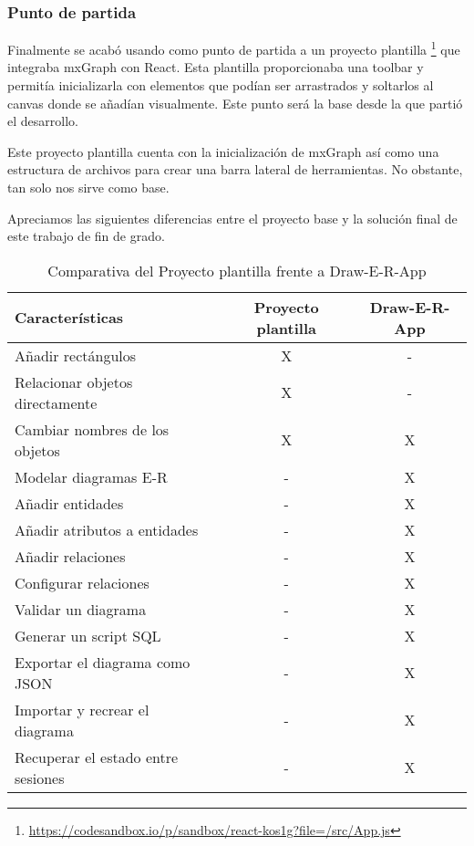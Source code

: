 \subsubsection{Punto de partida}
Finalmente se acabó usando como punto de partida a un proyecto plantilla \footnote{\url{https://codesandbox.io/p/sandbox/react-kos1g?file=/src/App.js}} que integraba mxGraph con React. Esta plantilla proporcionaba una toolbar y permitía inicializarla con elementos que podían ser arrastrados y soltarlos al canvas donde se añadían visualmente. Este punto será la base desde la que partió el desarrollo.

Este proyecto plantilla cuenta con la inicialización de mxGraph así como una estructura de archivos para crear una barra lateral de herramientas. No obstante, tan solo nos sirve como base.

Apreciamos las siguientes diferencias entre el proyecto base y la solución final de este trabajo de fin de grado.
\begin{table}[h]
\centering
\begin{tabular}{l c c}
\hline
\multicolumn{1}{l}{Características} & \textbf{Proyecto plantilla} & \textbf{Draw-E-R-App} \\
\hline
Añadir rectángulos & X & - \\
Relacionar objetos directamente & X & - \\
Cambiar nombres de los objetos & X & X \\
Modelar diagramas E-R & - & X \\
Añadir entidades & - & X \\
Añadir atributos a entidades & - & X \\
Añadir relaciones & - & X \\
Configurar relaciones & - & X \\
Validar un diagrama & - & X \\
Generar un script SQL & - & X \\
Exportar el diagrama como JSON & - & X \\
Importar y recrear el diagrama & - & X \\
Recuperar el estado entre sesiones & - & X \\
\hline
\end{tabular}
\caption{Comparativa del Proyecto plantilla frente a Draw-E-R-App}
\label{comparativa}
\end{table}

